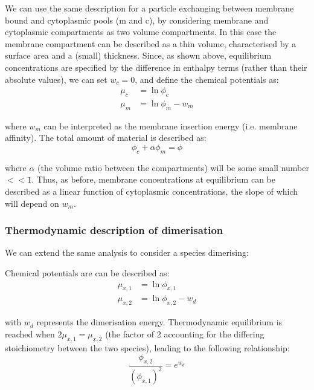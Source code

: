 \documentclass[12pt]{"article"}
\begin{document}
We can use the same description for a particle exchanging between membrane bound and cytoplasmic pools (m and c), by considering membrane and cytoplasmic compartments as two volume compartments. In this case the membrane compartment can be described as a thin volume, characterised by a surface area and a (small) thickness. Since, as shown above, equilibrium concentrations are specified by the difference in enthalpy terms (rather than their absolute values), we can set $w_c = 0$, and define the chemical potentials as:
\begin{align}
\mu_c &= \ln\phi_c\\
\mu_m &= \ln\phi_m - w_m
\end{align} 

where $w_m$ can be interpreted as the membrane insertion energy (i.e. membrane affinity). The total amount of material is described as:
\begin{equation}
\phi_c + \alpha\phi_m = \phi
\end{equation}

where $\alpha$ (the volume ratio between the compartments) will be some small number $<<1$. Thus, as before, membrane concentrations at equilibrium can be described as a linear function of cytoplasmic concentrations, the slope of which will depend on $w_m$.\\

\subsubsection{Thermodynamic description of dimerisation}

We can extend the same analysis to consider a species dimerising:

\begin{center}
\end{center}

Chemical potentials are can be described as:
\begin{align}
\mu_{x,1} &= \ln\phi_{x,1}\\
\mu_{x,2} &= \ln\phi_{x,2} - w_d
\end{align} 

with $w_d$ represents the dimerisation energy. Thermodynamic equilibrium is reached when $2\mu_{x,1} = \mu_{x,2}$ (the factor of 2 accounting for the differing stoichiometry between the two species), leading to the following relationship:
\begin{equation}
\frac{\phi_{x,2}}{(\phi_{x,1})^2} = e^{w_d}
\end{equation}
\end{document}
